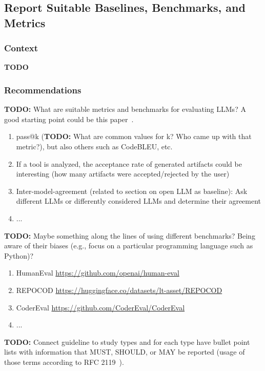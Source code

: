 \documentclass[11pt]{article}
\begin{document}
\subsection{Report Suitable Baselines, Benchmarks, and Metrics}

\subsubsection{Context}

\textbf{TODO}

\subsubsection{Recommendations}

\textbf{TODO:} What are suitable metrics and benchmarks for evaluating LLMs? A good starting point could be this paper~\cite{10.1145/3695988}.

\begin{enumerate}
\item pass@k (\textbf{TODO:} What are common values for k? Who came up with that metric?), but also others such as CodeBLEU, etc.
\item If a tool is analyzed, the acceptance rate of generated artifacts could be interesting (how many artifacts were accepted/rejected by the user)
\item Inter-model-agreement (related to section on open LLM as baseline): Ask different LLMs or differently considered LLMs and determine their agreement 
\item ...
\end{enumerate}

\textbf{TODO:} Maybe something along the lines of using different benchmarks? Being aware of their biases (e.g., focus on a particular programming language such as Python)?


\begin{enumerate}
\item HumanEval \url{https://github.com/openai/human-eval}
\item REPOCOD \url{https://huggingface.co/datasets/lt-asset/REPOCOD}
\item CoderEval \url{https://github.com/CoderEval/CoderEval}
\item ...
\end{enumerate}

\textbf{TODO:} Connect guideline to study types and for each type have bullet point lists with information that MUST, SHOULD, or MAY be reported (usage of those terms according to RFC 2119~\cite{rfc2119}).
\end{document}
